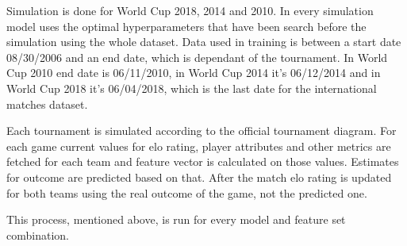 Simulation is done for World Cup 2018, 2014 and 2010. In every simulation model uses the optimal hyperparameters that have been search before the simulation using the whole dataset. Data used in training is between a start date 08/30/2006 and an end date, which is dependant of the tournament. In World Cup 2010 end date is 06/11/2010, in World Cup 2014 it's 06/12/2014 and in World Cup 2018 it's 06/04/2018, which is the last date for the international matches dataset.

Each tournament is simulated according to the official tournament diagram. For each game current values for elo rating, player attributes and other metrics are fetched for each team and feature vector is calculated on those values. Estimates for outcome are predicted based on that. After the match elo rating is updated for both teams using the real outcome of the game, not the predicted one.

This process, mentioned above, is run for every model and feature set combination.